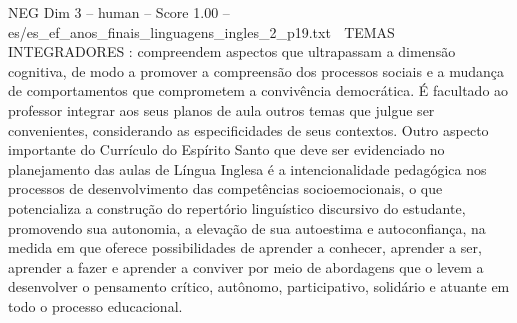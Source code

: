 \begin{textsample}{NEG Dim 3 – human – Score 1.00 – es/es\_ef\_anos\_finais\_linguagens\_ingles\_2\_p19.txt}  \label{ex:f3_neg_007}
 TEMAS INTEGRADORES : compreendem aspectos que ultrapassam a dimensão cognitiva, de modo a promover a compreensão dos processos sociais e a mudança de comportamentos que comprometem a convivência democrática. É facultado ao professor integrar aos seus planos de aula outros temas que julgue ser convenientes, considerando as especificidades de seus contextos.
Outro aspecto importante do Currículo do Espírito Santo que deve ser evidenciado no planejamento das aulas de Língua Inglesa é a intencionalidade pedagógica nos processos de desenvolvimento das competências socioemocionais, o que potencializa a construção do repertório linguístico discursivo do estudante, promovendo sua autonomia, a elevação de sua autoestima e autoconfiança, na medida em que oferece possibilidades de aprender a conhecer, aprender a ser, aprender a fazer e aprender a conviver por meio de abordagens que o levem a desenvolver o pensamento crítico, autônomo, participativo, solidário e atuante em todo o processo educacional.

\end{textsample}

